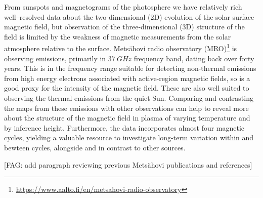 \documentclass{aa}
\newcommand{\fag}[1]{\textcolor{midpurple}{[FAG: #1]}} %
\begin{document}
  From sunspots and magnetograms of the photosphere we have relatively rich
  well--resolved
  data about the 
  two-dimensional (2D) 
  evolution of the solar surface magnetic 
  field, but observation of the three-dimensional (3D)
  structure of the field is limited by the 
  weakness of magnetic measurements from the solar atmosphere relative to the
  surface.
  Mets\"ahovi radio observatory (MRO)\footnote{
  \href{https://www.aalto.fi/en/metsahovi-radio-observatory}{
        https://www.aalto.fi/en/metsahovi-radio-observatory}}
  is observing emissions, primarily in
  $\SI{37}{GHz}$ frequency band, dating back over forty years.
  This is in the frequency range suitable for detecting non-thermal emissions
  from high energy electrons associated with active-region magnetic fields, so
  is a good proxy for the intensity of the magnetic field.
  These are also well suited to observing the thermal emissions from the quiet
  Sun.
  Comparing and contrasting the maps from these emissions with other
  observations can help to reveal more about the structure of the magnetic
  field in plasma of varying temperature and by inference height.
  Furthermore, the data incorporates almost four magnetic cycles, yielding
  a valuable resource to investigate long-term variation within and bewteen 
  cycles, alongside and in contrast to other sources.

  \fag{add paragraph reviewing previous Mets\"ahovi publications and references}
\end{document}
